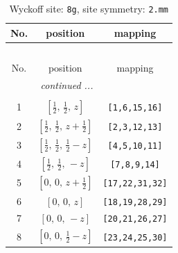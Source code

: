 \documentclass[fleqn,8pt]{jsarticle}
\begin{document}
\begin{longtable}{ccc}
\caption{Wyckoff site: {\tt 8g}, site symmetry: {\tt 2.mm}}
 \\
 \hline \hline
No. & position & mapping \\ \hline \endfirsthead

\multicolumn{2}{l}{\tablename\ \thetable{}} \\
 \hline \hline
No. & position & mapping \\ \hline \endhead

 \hline \hline
\multicolumn{2}{r}{\footnotesize\it continued ...} \\ \endfoot

 \hline \hline
\multicolumn{2}{r}{} \\ \endlastfoot

1 & $\left[ \frac{1}{2},\, \frac{1}{2},\, z \right]$ & {\tt [1,6,15,16]} \\ \hline
2 & $\left[ \frac{1}{2},\, \frac{1}{2},\, z + \frac{1}{2} \right]$ & {\tt [2,3,12,13]} \\ \hline
3 & $\left[ \frac{1}{2},\, \frac{1}{2},\, \frac{1}{2} - z \right]$ & {\tt [4,5,10,11]} \\ \hline
4 & $\left[ \frac{1}{2},\, \frac{1}{2},\, - z \right]$ & {\tt [7,8,9,14]} \\ \hline
5 & $\left[ 0,\, 0,\, z + \frac{1}{2} \right]$ & {\tt [17,22,31,32]} \\ \hline
6 & $\left[ 0,\, 0,\, z \right]$ & {\tt [18,19,28,29]} \\ \hline
7 & $\left[ 0,\, 0,\, - z \right]$ & {\tt [20,21,26,27]} \\ \hline
8 & $\left[ 0,\, 0,\, \frac{1}{2} - z \right]$ & {\tt [23,24,25,30]} \\
\end{longtable}
\renewcommand{\arraystretch}{1.2}
\end{document}
